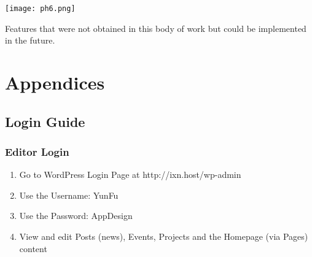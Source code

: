 \documentclass[fontsize=11pt]{extarticle}
\numberwithin{figure}{section} %
\numberwithin{table}{section}%
\begin{document}
\begin{table}[H]
      \centering
      \texttt{[image: ph6.png]}
      \caption{Features that were not obtained in this body of work but could be implemented in the future.}
 \end{table}
\newpage

% 

\printbibliography


\newpage
\section{Appendices}

\subsection{Login Guide}
\subsubsection{Editor Login}

\begin{enumerate}

  \item Go to WordPress Login Page at http://ixn.host/wp-admin
  \item Use the Username: YunFu
  \item Use the Password: AppDesign
  \item View and edit Posts (news), Events, Projects and the Homepage (via Pages) content

\end{enumerate}
\end{document}
